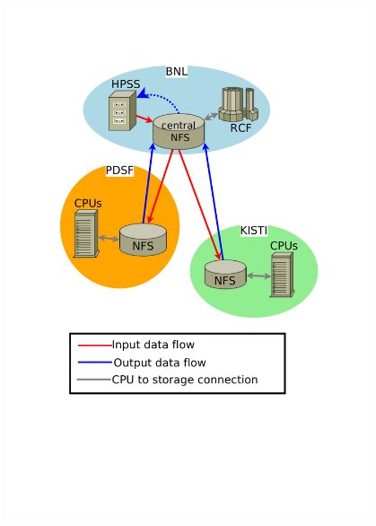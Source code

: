 \documentclass{beamer}
\begin{document}
\begin{frame}
\begin{columns}[c]
\begin{footnotesize}
 	\end{footnotesize}
 		\vspace{-5mm}
		\begin{figure}   
				\includegraphics[trim = 25mm 10mm 0mm 30mm, clip, width=1.2\textwidth]{pic/Data_production_schema2.pdf}
		\end{figure} 	 	
 	\end{columns}
\end{frame}
\end{document}
